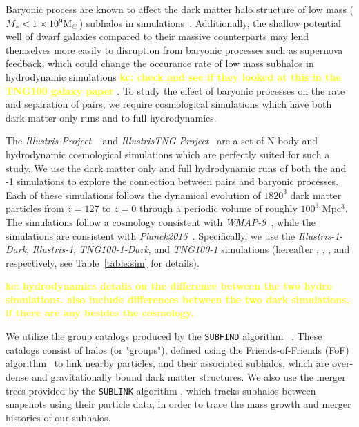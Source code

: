 \documentclass[twocolumn]{aastex631}
\newcommand{\kc}[1]{\textcolor{yellow}{\textbf{kc: #1}} }
\begin{document}
Baryonic process are known to affect the dark matter halo structure of low mass ($M_*<1\times10^9\mathrm{M}_\odot$) subhalos in simulations~\citep[see e.g.][and references therein]{Sales:2022}.
Additionally, the shallow potential well of dwarf galaxies compared to their massive counterparts may lend themselves more easily to disruption from baryonic processes such as supernova feedback, which could change the occurance rate of low mass subhalos in hydrodynamic simulations \kc{check and see if they looked at this in the TNG100 galaxy paper}.
To study the effect of baryonic processes on the rate and separation of pairs, we require cosmological simulations which have both dark matter only runs and to full hydrodynamics.

The \textit{Illustris Project} ~\citep{vogelsberger14A,nelson15} and \textit{IllustrisTNG Project}~\citep{TNG1, TNG2, TNG3, TNG4, TNG5} are a set of N-body and hydrodynamic cosmological simulations which are perfectly suited for such a study. 
We use the dark matter only and full hydrodynamic runs of both the  and -1 simulations to explore the connection between pairs and baryonic processes. 
Each of these simulations follows the dynamical evolution of $1820^3$ dark matter particles from $z=127$ to $z=0$ through a periodic volume of roughly $100^3$ Mpc$^3$. 
The \ill{} simulations follow a cosmology consistent with \textit{WMAP-9}~\citep{hinshaw13}, while the \tng{} simulations are consistent with \textit{Planck2015}~\citep{Planck2015}.
Specifically, we use the \textit{Illustris-1-Dark}, \textit{Illustris-1}, \textit{TNG100-1-Dark}, and \textit{TNG100-1} simulations (hereafter \illd, \illh, \tngd, and \tngh{} respectively, see Table~\ref{table:sim} for details).

\kc{hydrodynamics details on the difference between the two hydro simulations. also include differences between the two dark simulations, if there are any besides the cosmology. }

We utilize the group catalogs produced by the \texttt{SUBFIND} algorithm ~\citep{springel01,dolag09}. 
These catalogs consist of halos (or "groups"), defined using the Friends-of-Friends (FoF) algorithm~\citep{davis85} to link nearby particles, and their associated subhalos, which are over-dense and gravitationally bound dark matter structures.
We also use the merger trees provided by the \texttt{SUBLINK} algorithm \citep{gomez15}, which tracks subhalos between snapshots using their particle data, in order to trace the mass growth and merger histories of our subhalos.
\end{document}
